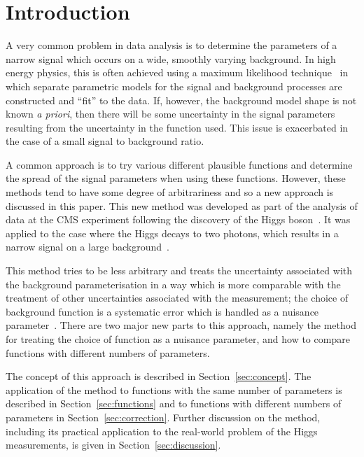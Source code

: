 \section{Introduction} %
\label{sec:introduction}

A very common problem in data analysis is to determine the parameters of
a narrow signal which occurs on a wide, smoothly varying background. 
In high energy physics, this is often achieved using a maximum likelihood technique~\cite{ref:Fisher01011922} 
in which separate parametric models for the signal and background processes are constructed and 
``fit'' to the data.
If, however, the background model shape is not known {\it a priori}, then there will be 
some uncertainty in the signal parameters resulting from the uncertainty in
the function used. This issue is exacerbated in the case of a small signal to
background ratio.

A common approach is to try various different plausible functions and 
determine the spread of the signal parameters when using these functions.
However, these methods tend to have some degree of arbitrariness and so
a new approach is discussed in this paper.
This new method was developed as part of the analysis of data at the CMS experiment
following the discovery of the Higgs
boson~\cite{ref:introduction:atlasdis,ref:introduction:cmsdis}.
It was applied to the case where the Higgs decays to two photons, which
results in a narrow signal on a large 
background~\cite{ref:introduction:legacy}.

This method tries to be less 
arbitrary and treats the uncertainty associated with the
background parameterisation in a way
which is more comparable with the treatment of other 
uncertainties associated with the measurement; the choice of background function 
is a systematic error which is handled as a nuisance parameter~\cite{ref:intro:nusiances}.
There are two major new parts to this approach, namely the method for
treating the choice of function as a nuisance parameter, and how to compare 
functions with different numbers of parameters.

The concept of this approach is described in Section~\ref{sec:concept}.
The application of the method to functions with the same number of parameters
is described in Section~\ref{sec:functions} and to functions with different
numbers of parameters in Section~\ref{sec:correction}. Further discussion on
the method, including its practical application to the real-world problem of
the Higgs measurements, is given in Section~\ref{sec:discussion}.

